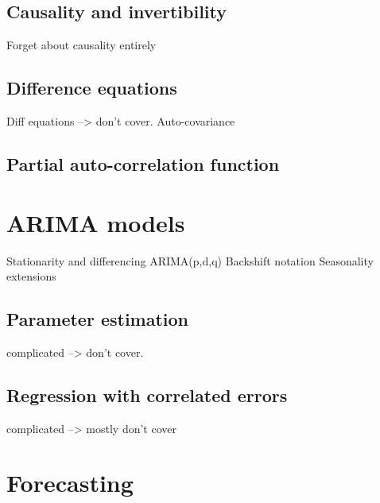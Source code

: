 \documentclass{article}
\begin{document}
\subsection{Causality and invertibility}

Forget about causality entirely

\subsection{Difference equations}

Diff equations --> don't cover.
Auto-covariance

\subsection{Partial auto-correlation function}

\section{ARIMA models}

Stationarity and differencing
ARIMA(p,d,q)
Backshift notation
Seasonality extensions

\subsection{Parameter estimation}

complicated --> don't cover.

\subsection{Regression with correlated errors}

complicated --> mostly don't cover

\section{Forecasting}
\end{document}

